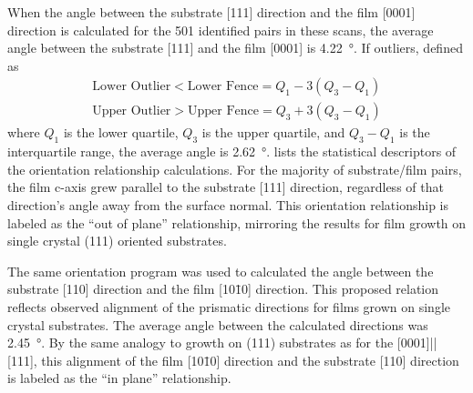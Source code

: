 %	
%		
%		
%		
%		
%		
%		
%		
%		
When the angle between the substrate [111] direction and the film [0001] direction is
calculated for the 501 identified pairs in these scans, the average angle between the
substrate [111] and the film [0001] is \SI{4.22}{\degree}. If outliers, defined as
\begin{gather}
\text{Lower Outlier} < \text{Lower Fence} = Q_{1}-3(Q_{3}-Q_{1})\\
\text{Upper Outlier} > \text{Upper Fence}=  Q_{3}+3(Q_{3}-Q_{1})
\end{gather}
where $Q_{1}$ is the lower quartile, $Q_{3}$ is the upper quartile, and $Q_{3}-Q_{1}$ is
the interquartile range, the average angle is \SI{2.62}{\degree}.
 lists the statistical descriptors of the orientation
relationship calculations. For the majority of substrate/film pairs, the film c-axis grew
parallel to the substrate [111] direction, regardless of that direction's angle away from
the surface normal. This orientation relationship is labeled as the ``out of plane''
relationship, mirroring the results for film growth on single crystal (111) oriented \sto
substrates.

The same orientation program was used to calculated the angle between the substrate [110]
direction and the film [10\={1}0] direction. This proposed relation reflects observed
alignment of the prismatic directions for films grown on single crystal substrates. The
average angle between the calculated directions was \SI{2.45}{\degree}. By the same
analogy to growth on \sto (111) substrates as for the [0001]||[111],
this alignment of the film [10\={1}0] direction and the substrate [110] direction is
labeled as the ``in plane'' relationship.

